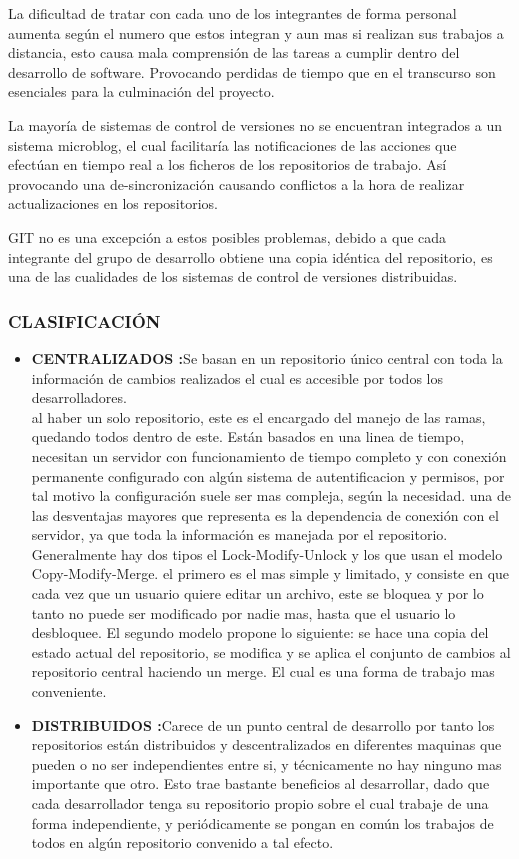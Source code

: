 La dificultad de tratar con cada uno de los integrantes de forma personal aumenta según el numero que estos integran y aun mas si realizan sus trabajos a distancia, esto causa mala comprensión de las tareas a cumplir dentro del desarrollo de software. Provocando perdidas de tiempo que en el transcurso son esenciales para la culminación del proyecto.

La mayoría de sistemas de control de versiones no se encuentran integrados a un sistema microblog, el cual facilitaría las notificaciones de las acciones que efectúan en tiempo real a los ficheros de los repositorios de trabajo. Así provocando una de-sincronización causando conflictos a la hora de realizar actualizaciones en los repositorios.

GIT no es una excepción a estos posibles problemas, debido a que cada integrante del grupo de desarrollo obtiene una copia idéntica del repositorio, es una de las cualidades de los sistemas de control de versiones distribuidas.
\subsubsection{CLASIFICACIÓN}

\begin{itemize}
\item \textbf{CENTRALIZADOS :}Se basan en un repositorio único central con toda la información de cambios realizados el cual es accesible por todos los desarrolladores.\\
al haber un solo repositorio, este es el encargado del manejo de las ramas, quedando todos dentro de este. Están basados en una linea de tiempo, necesitan un servidor con funcionamiento de tiempo completo y con conexión permanente
configurado con algún sistema de autentificacion y permisos, por tal motivo la configuración suele ser mas compleja, según la necesidad. 
una de las desventajas mayores que representa es la dependencia de conexión con el servidor, ya que toda la información es manejada por el repositorio. 
Generalmente hay dos tipos el Lock-Modify-Unlock y los que usan el modelo Copy-Modify-Merge. el primero es el mas simple y limitado, y consiste en que cada vez que un usuario quiere editar un archivo, este se bloquea y por lo tanto no puede ser
modificado por nadie mas, hasta que el usuario lo desbloquee. El segundo modelo propone lo siguiente: se hace una copia del estado actual del repositorio, se modifica y se aplica el conjunto de cambios al repositorio central haciendo un merge. El cual es una forma de trabajo mas conveniente.
\item \textbf{DISTRIBUIDOS :}Carece de un punto central de desarrollo por tanto los repositorios están distribuidos y descentralizados en diferentes maquinas que pueden o no ser independientes entre si, y 
técnicamente no hay ninguno mas importante que otro. Esto trae bastante beneficios al desarrollar, dado que cada desarrollador tenga su repositorio propio sobre el cual trabaje de una forma independiente, y periódicamente se pongan en común los trabajos de todos en algún repositorio convenido a tal efecto.

\end{itemize}

